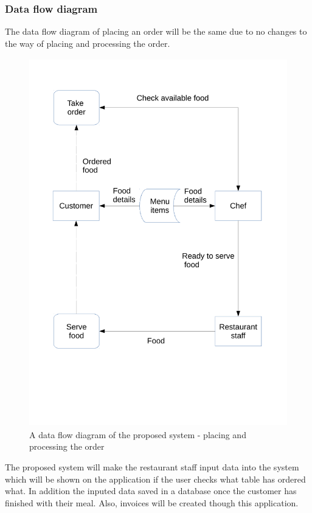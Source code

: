 \newpage

\subsubsection{Data flow diagram}

The data flow diagram of placing an order will be the same due to no changes to the way of placing and processing the order.

\begin{figure}[H]
    \includegraphics[height = 16cm]{./Analysis/PlacingOrder}
    \caption{A data flow diagram of the proposed system - placing and processing the order} \label{fig:Restaurantflow}
\end{figure}

\newpage

The proposed system will make the restaurant staff input data into the system which will be shown on the application if the user checks what table has ordered what. In addition the inputed data saved in a database once the customer has finished with their meal. Also, invoices will be created though this application.

